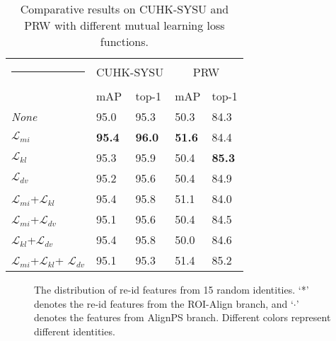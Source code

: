 \documentclass[journal]{IEEEtran}
\makeatletter
\newcommand{\thickhline}{\noalign {\ifnum 0=`}\fi \hrule height 1pt
    \futurelet \reserved@a \@xhline
}
\makeatother
\begin{document}
\begin{table}[t]
\small
\centering
\begin{tabular}{p{2.1cm}|p{1.1cm}<{\centering}p{1.1cm}<{\centering}|p{1.1cm}<{\centering}p{1.1cm}<{\centering}}
\hline\thickhline
\rowcolor{mygray} 
  & \multicolumn{2}{c|}{CUHK-SYSU} & \multicolumn{2}{c}{PRW}   \\ \cline{2-5} 
\rowcolor{mygray} 
\multirow{-2}{*}{Mutual Learning}  & mAP & top-1  & mAP  & top-1  \\  \hline \hline 
\textit{None}
   & 95.0     & 95.3       & 50.3   & 84.3   \\
$\mathcal{L}_{mi}$
   & \textbf{95.4}     & \textbf{96.0}      & \textbf{51.6}   & 84.4   \\
$\mathcal{L}_{kl}$  & 95.3   &  95.9      & 50.4   & \textbf{85.3}    \\ 
$\mathcal{L}_{dv}$  & 95.2   & 95.6       & 50.4   & 84.9  \\
$\mathcal{L}_{mi}$+$\mathcal{L}_{kl}$ & 95.4    & 95.8 & 51.1   & 84.0\\
$\mathcal{L}_{mi}$+$\mathcal{L}_{dv}$ & 95.1    & 95.6 & 50.4 & 84.5\\
$\mathcal{L}_{kl}$+$\mathcal{L}_{dv}$ & 95.4    & 95.8 & 50.0 & 84.6\\
$\mathcal{L}_{mi}$+$\mathcal{L}_{kl}$+ $\mathcal{L}_{dv}$ & 95.1    & 95.3 & 51.4 & 85.2\\
\hline
\end{tabular}
\caption{Comparative results on CUHK-SYSU and PRW with different mutual learning loss functions. }
\label{tab:mls}
\end{table}


\begin{figure}[t]
\vspace{-6mm}
\centering
{}
\hfill
\centering
{}
 \caption{The distribution of re-id features from 15 random identities. `*' denotes the re-id features from the ROI-Align branch, and `$\cdot$' denotes the features from AlignPS branch. Different colors represent different identities. }
 \label{fig:tsne}
\end{figure}
\end{document}
